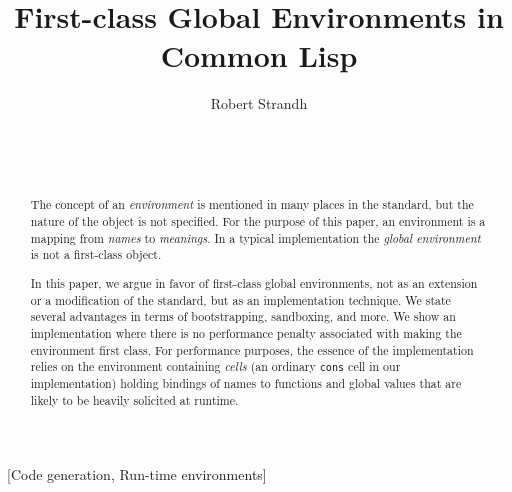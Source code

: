 \documentclass{acm_proc_article-sp}
\def\inputtex#1{}
\begin{document}
\title{First-class Global Environments in Common Lisp}
\author{\alignauthor
Robert Strandh\\
\\
\\
\\
}


\maketitle

\begin{abstract}
The concept of an \emph{environment} is mentioned in many places in
the \commonlisp{} standard, but the nature of the object is not
specified.  For the purpose of this paper, an environment is a mapping
from \emph{names} to \emph{meanings}.  In a typical \commonlisp{}
implementation the \emph{global environment} is not a first-class
object.

In this paper, we argue in favor of first-class global environments,
not as an extension or a modification of the \commonlisp{} standard,
but as an implementation technique.  We state several advantages in
terms of bootstrapping, sandboxing, and more.  We show an
implementation where there is no performance penalty associated with
making the environment first class.  For performance purposes, the
essence of the implementation relies on the environment containing
\emph{cells} (an ordinary \texttt{cons} cell in our implementation)
holding bindings of names to functions and global values that are
likely to be heavily solicited at runtime.
\end{abstract}

[Code generation, Run-time environments]



\inputtex{spec-macros.tex}

\inputtex{sec-introduction.tex}
\inputtex{sec-previous.tex}
\inputtex{sec-our-method.tex}
\inputtex{sec-benefits.tex}
\inputtex{sec-conclusions.tex}
\inputtex{app-protocol.tex}



\end{document}
